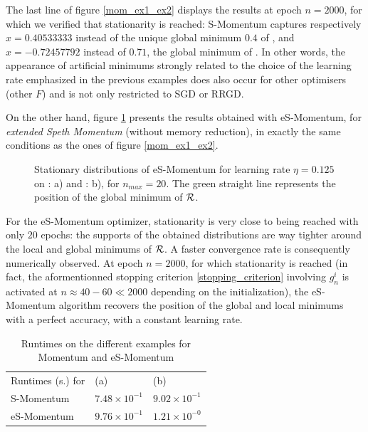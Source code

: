 \documentclass[article,authoryear,jmlmc]{beg_32}             %
\begin{document}
  The last line of figure \ref{mom_ex1_ex2} displays the results at epoch $n=2000$, for which we verified that stationarity is reached:  S-Momentum captures respectively
  $x=0.40533333$ instead of the unique global minimum $0.4$ of \exOne, 
  and $x=-0.72457792$ instead of $0.71$, the global minimum of \exTwo. 
  In other words, the appearance of artificial minimums strongly related to the choice of the learning rate emphasized in the previous examples does also occur for other optimisers
  (other $F$) and is not only restricted to SGD or RRGD. 

  On the other hand, figure \ref{speth_mom_ex1_ex2} presents the results obtained with eS-Momentum, for {\em extended Speth Momentum} {(without memory reduction)}, in exactly the same conditions as the ones of figure \ref{mom_ex1_ex2}. 
\begin{figure}[!h]
	\centering
	\scalebox{0.60}{}
	\scalebox{0.60}{}
        \caption{Stationary distributions of eS-Momentum for learning rate $\eta=0.125$ on \exOne: a) and \exTwo: b), for $n_{max}=20$. The green straight line represents the position of the global minimum of $\mathcal{R}$.}
	\label{speth_mom_ex1_ex2}
\end{figure}
For the eS-Momentum optimizer, stationarity is very close to being reached with only $20$ epochs: the supports of the obtained distributions are way tighter around the local and
global minimums of $\mathcal{R}$. A faster convergence rate is consequently numerically observed.  
  At epoch $n=2000$, for which stationarity is reached (in fact, the aformentionned stopping criterion \eqref{stopping_criterion} involving $g_n^i$ is activated at $n\approx 40 - 60 \ll 2000$ depending on the
  initialization), the eS-Momentum algorithm recovers the 
  position of the global and local minimums with a perfect accuracy, with a constant learning rate. 

\begin{table}[h!]
	\caption{Runtimes on the different examples for Momentum and eS-Momentum}
        \begin{tabular}{lll}
          Runtimes (s.) for & (a)                &  (b)              \\ 
          S-Momentum        & $7.48 \times 10^{-1}$ & $9.02\times 10^{-1}$  \\ 
         eS-Momentum        & $9.76 \times 10^{-1}$ & $1.21\times 10^{-0}$\\ 
	\end{tabular}
	\label{ex1_example}
\end{table}
\end{document}
